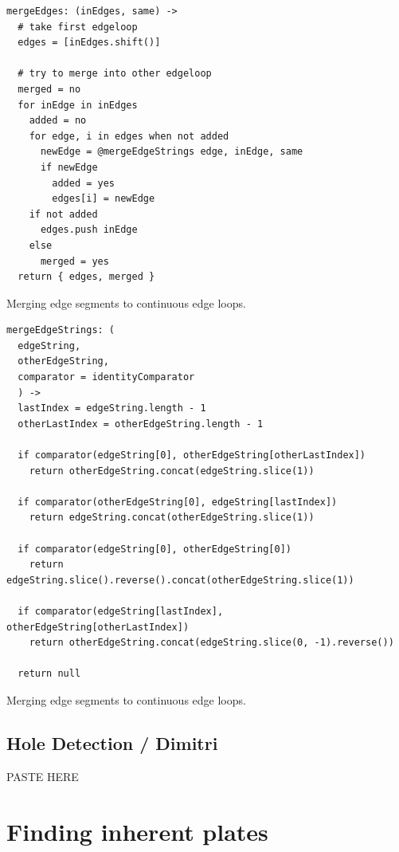 \documentclass[../ClassicThesis.tex]{subfiles}
\begin{document}

\begin{listing}
\begin{verbatim}
mergeEdges: (inEdges, same) ->
  # take first edgeloop
  edges = [inEdges.shift()]

  # try to merge into other edgeloop
  merged = no
  for inEdge in inEdges
    added = no
    for edge, i in edges when not added
      newEdge = @mergeEdgeStrings edge, inEdge, same
      if newEdge
        added = yes
        edges[i] = newEdge
    if not added
      edges.push inEdge
    else
      merged = yes
  return { edges, merged }
\end{verbatim}
\caption{Merging edge segments to continuous edge loops.}
\label{lst:mergeEdges}
\end{listing}

\begin{listing}
\begin{verbatim}
mergeEdgeStrings: (
  edgeString,
  otherEdgeString,
  comparator = identityComparator
  ) ->
  lastIndex = edgeString.length - 1
  otherLastIndex = otherEdgeString.length - 1

  if comparator(edgeString[0], otherEdgeString[otherLastIndex])
    return otherEdgeString.concat(edgeString.slice(1))

  if comparator(otherEdgeString[0], edgeString[lastIndex])
    return edgeString.concat(otherEdgeString.slice(1))

  if comparator(edgeString[0], otherEdgeString[0])
    return edgeString.slice().reverse().concat(otherEdgeString.slice(1))

  if comparator(edgeString[lastIndex], otherEdgeString[otherLastIndex])
    return otherEdgeString.concat(edgeString.slice(0, -1).reverse())

  return null
\end{verbatim}
\caption{Merging edge segments to continuous edge loops.}
\label{lst:mergeEdgeStrings}
\end{listing}

\subsection{Hole Detection / Dimitri}\label{sub:holedetection}

PASTE HERE

\section{Finding inherent plates}\label{sec:inherentplates}
\end{document}
